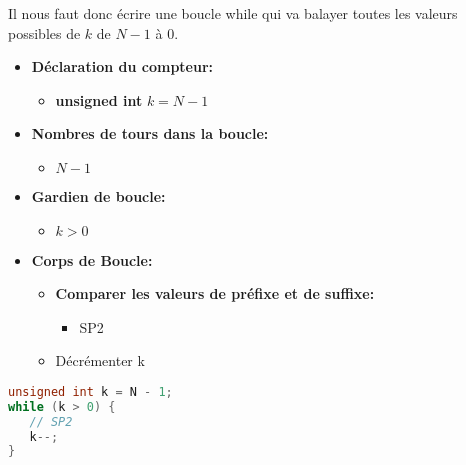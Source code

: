 \vspace{0.4cm}
Il nous faut donc écrire une boucle while qui va balayer toutes les valeurs 
possibles de $k$ de $N-1$ à 0.
\begin{itemize}
   \item \textbf{Déclaration du compteur:}
      \begin{itemize}
         \item \textbf{unsigned int} $k = N-1$
      \end{itemize}
   \item \textbf{Nombres de tours dans la boucle:}
      \begin{itemize}
         \item $N-1$
      \end{itemize}
   \item \textbf{Gardien de boucle:}
      \begin{itemize}
         \item $k > 0$
      \end{itemize}
   \item \textbf{Corps de Boucle:}
   \begin{itemize}
      \item \textbf{Comparer les valeurs de préfixe et de suffixe:}
      \begin{itemize}
         \item SP2
      \end{itemize}
      \item Décrémenter k
   \end{itemize}
\end{itemize}

\begin{lstlisting}[language=C, caption=SP1]
unsigned int k = N - 1;
while (k > 0) {
   // SP2
   k--;
}
\end{lstlisting}

